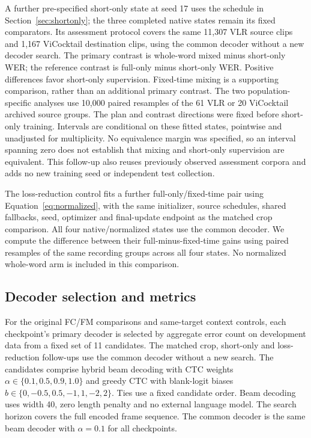 A further pre-specified short-only state at seed 17 uses the schedule in
Section~\ref{sec:shortonly}; the three completed native states remain its fixed
comparators. Its assessment protocol covers the same 11,307 VLR source clips
and 1,167 ViCocktail destination clips, using the common decoder without a new
decoder search. The primary contrast is whole-word mixed minus short-only WER;
the reference contrast is full-only minus short-only WER. Positive differences
favor short-only supervision. Fixed-time mixing is a supporting comparison,
rather than an additional primary contrast. The two population-specific analyses
use 10,000 paired resamples of the 61 VLR or 20 ViCocktail archived source groups.
The plan and contrast directions were fixed before short-only training.
Intervals are conditional on these fitted states, pointwise and unadjusted for
multiplicity. No equivalence margin was specified, so an interval spanning zero
does not establish that mixing and short-only supervision are equivalent.
This follow-up also reuses previously observed assessment corpora and adds no
new training seed or independent test collection.

The loss-reduction control fits a further full-only/fixed-time pair using
Equation~\ref{eq:normalized}, with the same initializer, source schedules,
shared fallbacks, seed, optimizer and final-update endpoint as the matched crop
comparison. All four native/normalized states use the common decoder. We compute
the difference between their full-minus-fixed-time gains using paired resamples
of the same recording groups across all four states. No normalized whole-word
arm is included in this comparison.

\subsection{Decoder selection and metrics}
For the original FC/FM comparisons and same-target context controls, each
checkpoint's primary decoder is selected by aggregate error count on development
data from a fixed set of 11 candidates. The matched crop, short-only and
loss-reduction follow-ups use the common decoder without a new search. The candidates comprise hybrid
beam decoding with CTC weights $\alpha\in\{0.1,0.5,0.9,1.0\}$ and greedy CTC with
blank-logit biases $b\in\{0,-0.5,0.5,-1,1,-2,2\}$. Ties use a fixed candidate
order. Beam decoding uses width 40, zero length penalty and no external language
model. The search horizon covers the full encoded frame sequence. The common
decoder is the same beam decoder with $\alpha=0.1$ for all checkpoints.

